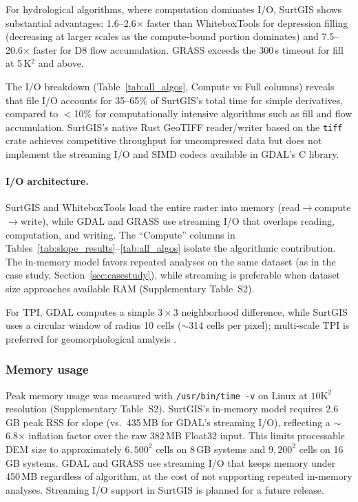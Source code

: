 \documentclass[preprint,review,12pt,authoryear]{elsarticle}
\begin{document}
For hydrological algorithms, where computation dominates I/O, SurtGIS shows substantial advantages: 1.6--2.6$\times$ faster than WhiteboxTools for depression filling (decreasing at larger scales as the compute-bound portion dominates) and 7.5--20.6$\times$ faster for D8 flow accumulation. GRASS exceeds the 300\,s timeout for fill at 5\,K$^2$ and above.

The I/O breakdown (Table~\ref{tab:all_algos}, Compute vs Full columns) reveals that file I/O accounts for 35--65\% of SurtGIS's total time for simple derivatives, compared to $<$10\% for computationally intensive algorithms such as fill and flow accumulation. SurtGIS's native Rust GeoTIFF reader/writer based on the \texttt{tiff} crate achieves competitive throughput for uncompressed data but does not implement the streaming I/O and SIMD codecs available in GDAL's C library.

\paragraph{I/O architecture.} SurtGIS and WhiteboxTools load the entire raster into memory (read$\rightarrow$compute$\rightarrow$write), while GDAL and GRASS use streaming I/O that overlaps reading, computation, and writing. The ``Compute'' columns in Tables~\ref{tab:slope_results}--\ref{tab:all_algos} isolate the algorithmic contribution. The in-memory model favors repeated analyses on the same dataset (as in the case study, Section~\ref{sec:casestudy}), while streaming is preferable when dataset size approaches available RAM (Supplementary Table~S2).

For TPI, GDAL computes a simple $3 \times 3$ neighborhood difference, while SurtGIS uses a circular window of radius 10 cells ($\sim$314 cells per pixel); multi-scale TPI is preferred for geomorphological analysis \citep{dereu2013, newman2018}.

\subsubsection{Memory usage}

Peak memory usage was measured with \texttt{/usr/bin/time -v} on Linux at $10\text{K}^2$ resolution (Supplementary Table~S2). SurtGIS's in-memory model requires 2.6\,GB peak RSS for slope (vs.\ 435\,MB for GDAL's streaming I/O), reflecting a $\sim$6.8$\times$ inflation factor over the raw 382\,MB Float32 input. This limits processable DEM size to approximately $6{,}500^2$ cells on 8\,GB systems and $9{,}200^2$ cells on 16\,GB systems. GDAL and GRASS use streaming I/O that keeps memory under 450\,MB regardless of algorithm, at the cost of not supporting repeated in-memory analyses. Streaming I/O support in SurtGIS is planned for a future release.
\end{document}
